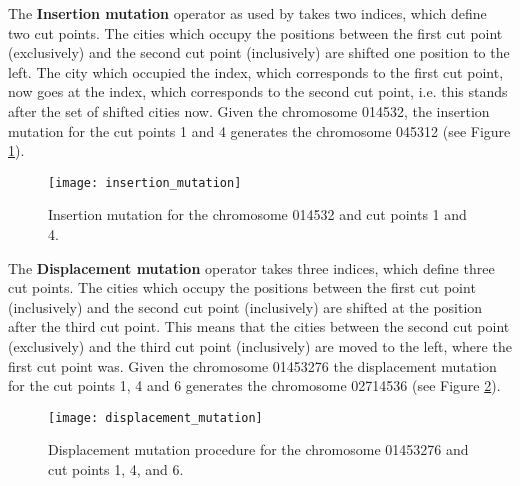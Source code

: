 The \textbf{Insertion mutation} operator as used by \citeauthor{akay2013recent} \cite{akay2013recent} takes two indices, which define two cut points. The cities which occupy the positions between the first cut point (exclusively) and the second cut point (inclusively) are shifted one position to the left. The city which occupied the index, which corresponds to the first cut point, now goes at the index, which corresponds to the second cut point, i.e. this stands after the set of shifted cities now. Given the chromosome 014532, the insertion mutation for the cut points 1 and 4 generates the chromosome 045312 (see Figure \ref{insertion_mutation}).

\begin{figure}[htp] \centering
	\centering
	\texttt{[image: insertion\_mutation]}
	\caption{Insertion mutation for the chromosome 014532 and cut points 1 and 4.}
	\label{insertion_mutation}
\end{figure}

The \textbf{Displacement mutation} operator \cite{akay2013recent} takes three indices, which define three cut points. The cities which occupy the positions between the first cut point (inclusively) and the second cut point (inclusively) are shifted at the position after the third cut point.  This means that the cities between the second cut point (exclusively) and the third cut point (inclusively) are moved to the left, where the first cut point was. Given the chromosome 01453276 the displacement mutation for the cut points 1, 4 and 6 generates the chromosome 02714536 (see Figure \ref{displacement_mutation}).

\begin{figure}[htp] \centering
	\centering
	\texttt{[image: displacement\_mutation]}
	\caption{Displacement mutation procedure for the chromosome 01453276 and cut points 1, 4, and 6.}
	\label{displacement_mutation}
\end{figure}